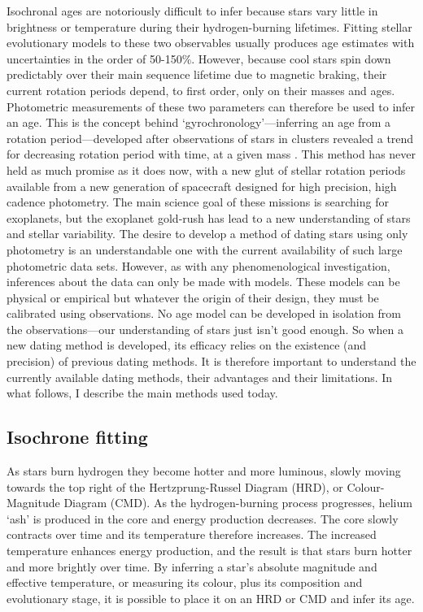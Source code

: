 Isochronal ages are notoriously difficult to infer because stars vary little
in brightness or temperature during their hydrogen-burning lifetimes.
Fitting stellar evolutionary models to these two observables usually produces
age estimates with uncertainties in the order of 50-150\%.
However, because cool stars spin down predictably over their main sequence
lifetime due to magnetic braking, their current rotation periods depend, to
first order, only on their masses and ages.
Photometric measurements of these two parameters can therefore be used to
infer an age.
This is the concept behind `gyrochronology'---inferring an age from a rotation
period---developed after observations of stars in clusters revealed a trend
for decreasing rotation period with time, at a given mass \citep{Weber1967,
Skumanich1972, Barnes2003, Irwin2009}.
This method has never held as much promise as it does now, with a new glut of
stellar rotation periods available from a new generation of spacecraft
designed for high precision, high cadence photometry.
The main science goal of these missions is searching for exoplanets, but the
exoplanet gold-rush has lead to a new understanding of stars and stellar
variability.
The desire to develop a method of dating stars using only photometry is an
understandable one with the current availability of such large photometric
data sets.
However, as with any phenomenological investigation, inferences about the data
can only be made with models.
These models can be physical or empirical but whatever the origin of their
design, they must be calibrated using observations.
No age model can be developed in isolation from the observations---our
understanding of stars just isn't good enough.
So when a new dating method is developed, its efficacy relies on the existence
(and precision) of previous dating methods.
It is therefore important to understand the currently available dating
methods, their advantages and their limitations.
In what follows, I describe the main methods used today.

\subsection{Isochrone fitting}

As stars burn hydrogen they become hotter and more luminous, slowly moving
towards the top right of the Hertzprung-Russel Diagram (HRD), or
Colour-Magnitude Diagram (CMD).
As the hydrogen-burning process progresses, helium `ash' is produced in the
core and energy production decreases.
The core slowly contracts over time and its temperature therefore increases.
The increased temperature enhances energy production, and the result is that
stars burn hotter and more brightly over time.
By inferring a star's absolute magnitude and effective temperature, or
measuring its colour, plus its composition and evolutionary stage, it is
possible to place it on an HRD or CMD and infer its age.

